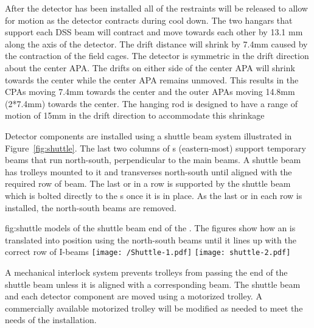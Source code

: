 After the detector has been installed all of the restraints will be released to allow for motion as the detector contracts during cool down.  The two hangars that support each DSS beam will contract and move towards each other by 13.1 mm along the axis of the detector.  
The drift distance will shrink by 7.4mm caused by the contraction of the field cages.  The detector is symmetric in the drift direction about the center APA.  The drifts on either side of the center APA will  shrink towards the center while the center APA remains unmoved.  This results in the CPAs moving 7.4mm towards the center and the outer APAs moving 14.8mm (2*7.4mm) towards the center.  The hanging rod is designed to have a range of motion of 15mm in the drift direction to accommodate this shrinkage




Detector components are installed using a shuttle beam system
illustrated in Figure~\ref{fig:shuttle}.  
The last two columns of
\fdth{}s (eastern-most) support temporary beams that run
north-south, perpendicular to the main  beams.  
A shuttle beam has trolleys mounted to it and transverses 
north-south until aligned with the required row of  beam.  
The last  or  in a row is supported by the shuttle beam which is bolted directly to the \fdth{}s once it is in place.  
As the last  or  in each row is installed, the north-south beams are removed.

\begin{dunefigure}{fig:shuttle}
  {\threed models of the shuttle beam end of the . The figures show how an 
is translated into position using the north-south beams until it lines up with the correct
row of I-beams}
\texttt{[image: /Shuttle-1.pdf]}
 \texttt{[image: shuttle-2.pdf]}
\end{dunefigure}

A mechanical interlock system  prevents trolleys
from passing the end of the shuttle beam unless it is aligned with a
corresponding  beam.  The shuttle beam and each detector component are
moved using a motorized trolley.  A commercially available motorized
trolley will be modified as needed to meet the needs of the
installation. 




